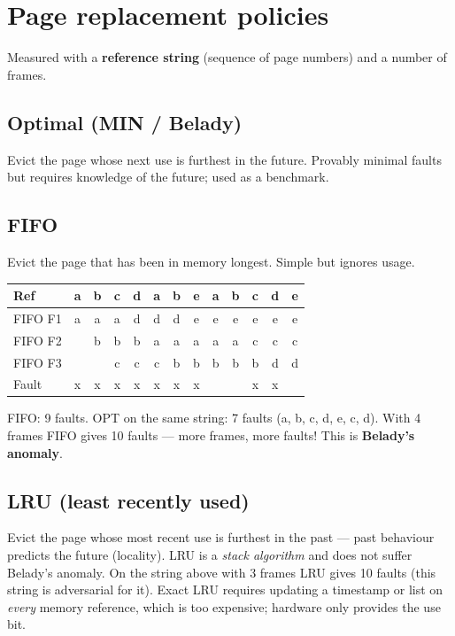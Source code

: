 \section{Page replacement policies}

Measured with a \textbf{reference string} (sequence of page numbers) and a number of frames.

\subsection{Optimal (MIN / Belady)}
Evict the page whose next use is furthest in the future. Provably minimal faults but
requires knowledge of the future; used as a benchmark.

\subsection{FIFO}
Evict the page that has been in memory longest. Simple but ignores usage.

\begin{example}
\begin{center}
\begin{tabular}{@{}l*{12}{c}@{}}
\toprule
Ref & a & b & c & d & a & b & e & a & b & c & d & e \\
\midrule
FIFO F1 & a & a & a & d & d & d & e & e & e & e & e & e \\
FIFO F2 &   & b & b & b & a & a & a & a & a & c & c & c \\
FIFO F3 &   &   & c & c & c & b & b & b & b & b & d & d \\
Fault & x & x & x & x & x & x & x &   &   & x & x &   \\
\bottomrule
\end{tabular}
\end{center}
FIFO: 9 faults. OPT on the same string: 7 faults (a, b, c, d, e, c, d). With 4 frames FIFO
gives 10 faults --- more frames, more faults! This is \textbf{Belady's anomaly}.
\end{example}

\subsection{LRU (least recently used)}
Evict the page whose most recent use is furthest in the past --- past behaviour predicts the
future (locality). LRU is a \emph{stack algorithm} and does not suffer Belady's anomaly. On the
string above with 3 frames LRU gives 10 faults (this string is adversarial for it).
Exact LRU requires updating a timestamp or list on \emph{every} memory reference, which is too
expensive; hardware only provides the use bit.

